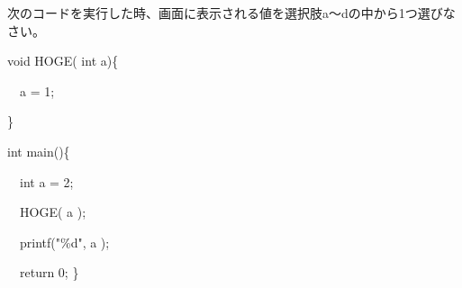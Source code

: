 次のコードを実行した時、画面に表示される値を選択肢a〜dの中から1つ選びなさい。\par
\noindent void HOGE( int a)\{ \par
\noindent 　a = 1; \par
\noindent \} \par
\noindent int main()\{ \par
\noindent 　int a = 2; \par
\noindent 　HOGE( a ); \par
\noindent 　printf("\%d", a ); \par
\noindent 　return 0; \} \par
